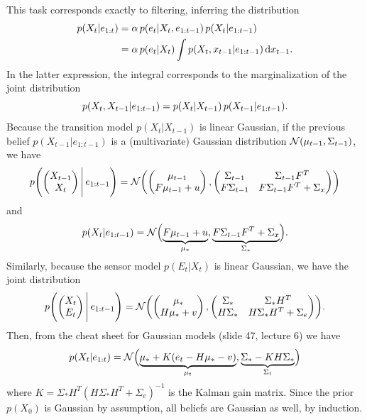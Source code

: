 \documentclass[11pt, a4paper]{article}
\begin{document}
\begin{enumerate}
    \begin{solution}
        This task corresponds exactly to filtering, \ie{} inferring the distribution
        \begin{align*}
            p(X_t \knowing e_{1:t}) & = \alpha \, p(e_t \knowing X_t, e_{1:t-1}) \, p(X_t \knowing e_{1:t-1}) \\
            & = \alpha \, p(e_t \knowing X_t) \int p(X_t, x_{t-1} \knowing e_{1:t-1}) \d{x_{t-1}} .
        \end{align*}
        In the latter expression, the integral corresponds to the marginalization of the joint distribution
        \begin{equation*}
            p(X_t, X_{t-1} \knowing e_{1:t-1}) = p(X_t | X_{t-1}) \, p(X_{t-1} | e_{1:t-1}) .
        \end{equation*}
        Because the transition model $p(X_t | X_{t-1})$ is linear Gaussian, if the previous belief $p(X_{t-1} | e_{1:t-1})$ is a (multivariate) Gaussian distribution $\N(\mu_{t-1}, \Sigma_{t-1})$, we have
        \begin{equation*}
            p\rbk*{ \mat{X_{t-1} \\ X_t} \Bigg\knowing \, e_{1:t-1} } = \N\rbk*{ \mat{\mu_{t-1} \\ F \mu_{t-1} + u}, \mat{ \Sigma_{t-1} & \Sigma_{t-1} F^T \\ F \Sigma_{t-1} & F \Sigma_{t-1} F^T + \Sigma_x } }
        \end{equation*}
        and
        \begin{equation*}
            p(X_t \knowing e_{1:t-1}) = \N\rbk[\Big]{ \underbrace{F \mu_{t-1} + u}_{\mu_*}, \underbrace{F \Sigma_{t-1} F^T + \Sigma_x}_{\Sigma_*} } .
        \end{equation*}
        Similarly, because the sensor model $p(E_t | X_t)$ is linear Gaussian, we have the joint distribution
        \begin{equation*}
            p\rbk*{ \mat{X_t \\ E_t} \Bigg\knowing \, e_{1:t-1} } = \N\rbk*{ \mat{\mu_* \\ H \mu_* + v}, \mat{ \Sigma_* & \Sigma_* H^T \\ H \Sigma_* & H \Sigma_* H^T + \Sigma_e } }.
        \end{equation*}
        Then, from the cheat sheet for Gaussian models (slide 47, lecture 6) we have
        \begin{equation*}
            p(X_t \knowing e_{1:t}) =
            \N\rbk[\Big]{ \underbrace{\mu_* + K (e_t - H \mu_* - v)}_{\mu_t}, \underbrace{\Sigma_* - K H \Sigma_*}_{\Sigma_t} }
        \end{equation*}
        where $K = \Sigma_* H^T (H \Sigma_* H^T + \Sigma_e)^{-1}$ is the Kalman gain matrix. Since the prior $p(X_0)$ is Gaussian by assumption, all beliefs are Gaussian as well, by induction.
    \end{solution}


\end{enumerate}
\end{document}
